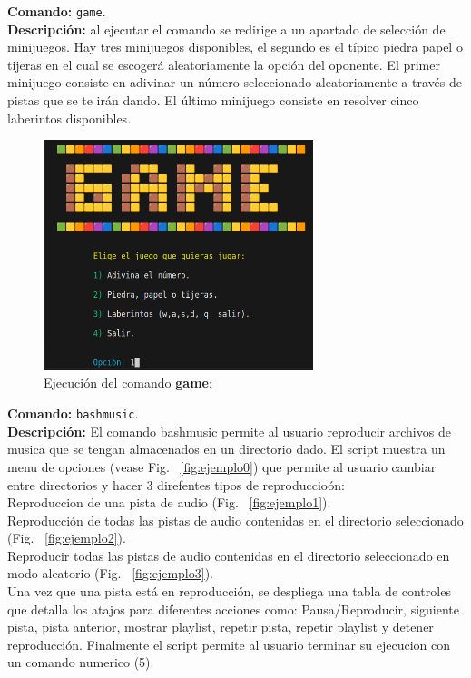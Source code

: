 \documentclass[titlepage]{article}
\begin{document}
\noindent
\textbf{Comando:} \verb|game|. \\
\textbf{Descripción:} al ejecutar el comando se redirige a un apartado de selección de minijuegos. Hay tres minijuegos disponibles, el segundo es el típico piedra papel o tijeras en el cual se escogerá aleatoriamente la opción del oponente. El primer minijuego consiste en adivinar un número seleccionado aleatoriamente a través de pistas que se te irán dando. El último minijuego consiste en resolver cinco laberintos disponibles. 

\begin{figure}[H]
    \centering
    \includegraphics[width=0.7\textwidth]{game.png}
    \caption{Ejecución del comando \textbf{game}:}
    \label{fig:ejemplo}
\end{figure}

\noindent
\textbf{Comando:} \verb|bashmusic|. \\
\textbf{Descripción:} El comando bashmusic permite al usuario reproducir archivos de musica que se tengan almacenados en un directorio dado. El script muestra un menu de opciones (vease Fig.~ \ref{fig:ejemplo0}) que permite al usuario cambiar entre directorios y hacer 3 direfentes tipos de reproduccioón: \\Reproduccion de una pista de audio (Fig.~ \ref{fig:ejemplo1}).\\Reproducción de todas las pistas de audio contenidas en el directorio seleccionado (Fig.~ \ref{fig:ejemplo2}).\\Reproducir todas las pistas de audio contenidas en el directorio seleccionado en modo aleatorio (Fig.~ \ref{fig:ejemplo3}).\\Una vez que una pista está en reproducción, se despliega una tabla de controles que detalla los atajos para diferentes acciones como: Pausa/Reproducir, siguiente pista, pista anterior, mostrar playlist, repetir pista, repetir playlist y detener reproducción. Finalmente el script permite al usuario terminar su ejecucion con un comando numerico (5).           
\end{document}
